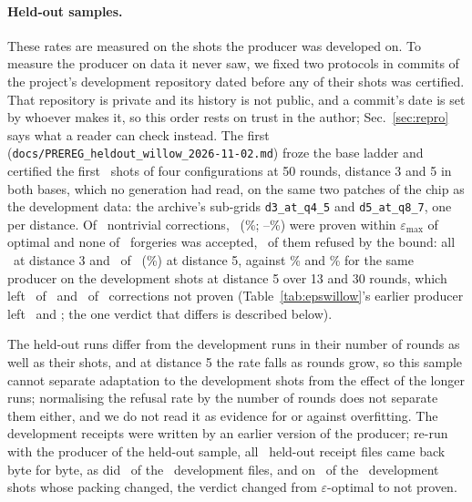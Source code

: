 \documentclass[aps,pra,twocolumn,superscriptaddress,nofootinbib,longbibliography,floatfix]{revtex4-2}
\newcommand{\eps}{\varepsilon}
\begin{document}
\begin{table}[tbp]
\caption{Willow configurations under the tolerance rule of the original runs and under the $\eps$-checker with $\eps_{\max}=10^{-6}$, on the same shots. $N$ counts nontrivial shots; the ladder is that of the generation each configuration is counted at (Sec.~\ref{sec:producer}); ``exact'' counts the shots proven with $\eps=0$. Proven fractions are rounded down.}
\label{tab:epswillow}

\end{table}

\paragraph*{Held-out samples.} These rates are measured on the shots the producer was developed on. To measure the producer on data it never saw, we fixed two protocols in commits of the project's development repository dated before any of their shots was certified. That repository is private and its history is not public, and a commit's date is set by whoever makes it, so this order rests on trust in the author; Sec.~\ref{sec:repro} says what a reader can check instead. The first (\nolinkurl{docs/PREREG_heldout_willow_2026-11-02.md}) froze the base ladder and certified the first \HoWShotsPerConfig\ shots of four configurations at 50 rounds, distance 3 and 5 in both bases, which no generation had read, on the same two patches of the chip as the development data: the archive's sub-grids \texttt{d3\_at\_q4\_5} and \texttt{d5\_at\_q8\_7}, one per distance. Of \HoWNontrivial\ nontrivial corrections, \HoWAccepted\ (\HoWPct\%; \HoWCILo--\HoWCIHi\%) were proven within $\eps_{\max}$ of optimal and none of \HoWForgeries\ forgeries was accepted, \HoWForgeriesBound\ of them refused by the bound: all \HoWDThreeN\ at distance 3 and \HoWDFiveAccepted\ of \HoWDFiveN\ (\HoWDFivePct\%) at distance 5, against \DevDFiveThirteenPct\% and \DevDFiveThirtyPct\% for the same producer on the development shots at distance 5 over 13 and 30 rounds, which left \DevDFiveThirteenNotProven\ of \DevDFiveThirteenN\ and \DevDFiveThirtyNotProven\ of \DevDFiveThirtyN\ corrections not proven (Table~\ref{tab:epswillow}'s earlier producer left \DevDFiveThirteenTableNotProven\ and \DevDFiveThirtyTableNotProven; the one verdict that differs is described below).

The held-out runs differ from the development runs in their number of rounds as well as their shots, and at distance 5 the rate falls as rounds grow, so this sample cannot separate adaptation to the development shots from the effect of the longer runs; normalising the refusal rate by the number of rounds does not separate them either, and we do not read it as evidence for or against overfitting. The development receipts were written by an earlier version of the producer; re-run with the producer of the held-out sample, all \IdentHeldChunks\ held-out receipt files came back byte for byte, as did \IdentDevIdentical\ of the \IdentDevChunks\ development files, and on \IdentDevStatusChanged\ of the \IdentDevDiffShots\ development shots whose packing changed, the verdict changed from $\eps$-optimal to not proven.
\end{document}
